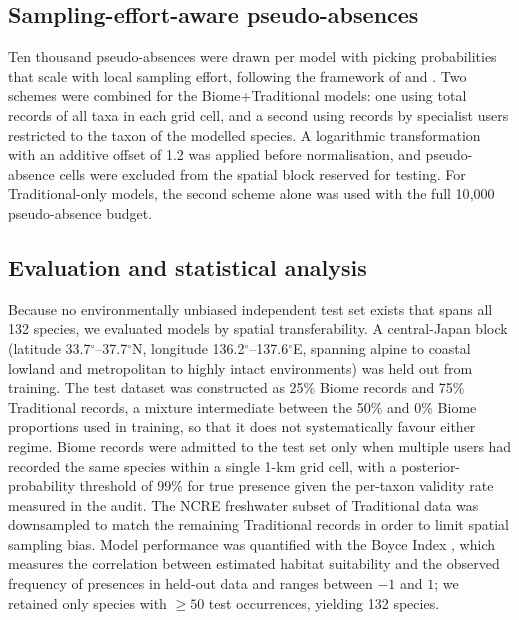 \documentclass[11pt]{article}
\begin{document}
\subsection{Sampling-effort-aware pseudo-absences}\label{sec:pseudo}

Ten thousand pseudo-absences were drawn per model with picking probabilities that scale with local sampling effort, following the framework of \citet{phillips2009samplebias} and \citet{milanesi2020observer}. Two schemes were combined for the Biome+Traditional models: one using total records of all taxa in each grid cell, and a second using records by specialist users restricted to the taxon of the modelled species. A logarithmic transformation with an additive offset of 1.2 was applied before normalisation, and pseudo-absence cells were excluded from the spatial block reserved for testing. For Traditional-only models, the second scheme alone was used with the full 10{,}000 pseudo-absence budget.

\subsection{Evaluation and statistical analysis}

Because no environmentally unbiased independent test set exists that spans all 132 species, we evaluated models by spatial transferability. A central-Japan block (latitude 33.7$^{\circ}$--37.7$^{\circ}$N, longitude 136.2$^{\circ}$--137.6$^{\circ}$E, spanning alpine to coastal lowland and metropolitan to highly intact environments) was held out from training. The test dataset was constructed as 25\% Biome records and 75\% Traditional records, a mixture intermediate between the 50\% and 0\% Biome proportions used in training, so that it does not systematically favour either regime. Biome records were admitted to the test set only when multiple users had recorded the same species within a single 1-km grid cell, with a posterior-probability threshold of 99\% for true presence given the per-taxon validity rate measured in the audit. The NCRE freshwater subset of Traditional data was downsampled to match the remaining Traditional records in order to limit spatial sampling bias. Model performance was quantified with the Boyce Index \citep{hirzel2006boyce}, which measures the correlation between estimated habitat suitability and the observed frequency of presences in held-out data and ranges between $-1$ and $1$; we retained only species with $\geq 50$ test occurrences, yielding 132 species.
\end{document}
